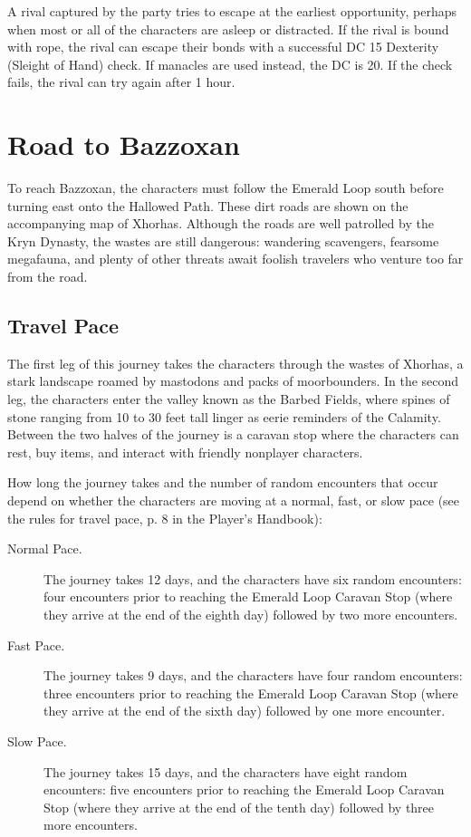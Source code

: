\documentclass[letterpaper, 11pt, bg=full, twocolumn]{dndbook}
\begin{document}
A rival captured by the party tries to escape at the earliest opportunity, perhaps when most or all of the characters are asleep or distracted. If the rival is bound with rope, the rival can escape their bonds with a successful DC 15 Dexterity (Sleight of Hand) check. If manacles are used instead, the DC is 20. If the check fails, the rival can try again after 1 hour.
\section{Road to Bazzoxan}

To reach Bazzoxan, the characters must follow the Emerald Loop south before turning east onto the Hallowed Path. These dirt roads are shown on the accompanying map of Xhorhas. Although the roads are well patrolled by the Kryn Dynasty, the wastes are still dangerous: wandering scavengers, fearsome megafauna, and plenty of other threats await foolish travelers who venture too far from the road.



\subsection{Travel Pace}

The first leg of this journey takes the characters through the wastes of Xhorhas, a stark landscape roamed by mastodons and packs of moorbounders. In the second leg, the characters enter the valley known as the Barbed Fields, where spines of stone ranging from 10 to 30 feet tall linger as eerie reminders of the Calamity. Between the two halves of the journey is a caravan stop where the characters can rest, buy items, and interact with friendly nonplayer characters.

How long the journey takes and the number of random encounters that occur depend on whether the characters are moving at a normal, fast, or slow pace (see the rules for travel pace, p. 8 in the Player's Handbook):

\begin{description}
\item[Normal Pace.] The journey takes 12 days, and the characters have six random encounters: four encounters prior to reaching the Emerald Loop Caravan Stop (where they arrive at the end of the eighth day) followed by two more encounters.
\item[Fast Pace.] The journey takes 9 days, and the characters have four random encounters: three encounters prior to reaching the Emerald Loop Caravan Stop (where they arrive at the end of the sixth day) followed by one more encounter.
\item[Slow Pace.] The journey takes 15 days, and the characters have eight random encounters: five encounters prior to reaching the Emerald Loop Caravan Stop (where they arrive at the end of the tenth day) followed by three more encounters.
\end{description}
\end{document}
